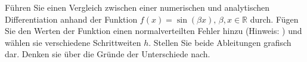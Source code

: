 \begin{aufg}[0]
Führen Sie einen Vergleich zwischen einer numerischen und analytischen Differentiation anhand der Funktion  $f(x)=\sin(\beta x),\, \beta,x \in \mathbb{R}$ durch.
Fügen Sie  den Werten der Funktion einen normalverteilten Fehler hinzu (Hinweis: ) und wählen sie verschiedene Schrittweiten $h$.
Stellen Sie beide Ableitungen grafisch dar. Denken sie über die Gründe der Unterschiede nach.
\end{aufg}
